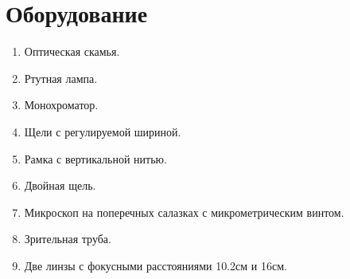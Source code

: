 \section*{Оборудование}

\begin{enumerate}
	\item Оптическая скамья.
	
	\item Ртутная лампа.
	
	\item Монохроматор.
	
	\item Щели с регулируемой шириной.
	
	\item Рамка с вертикальной нитью.
	
	\item Двойная щель.
	
	\item Микроскоп на поперечных салазках с микрометрическим винтом.
	
	\item Зрительная труба.
	
	\item Две линзы с фокусными расстояниями 10.2см и 16см.
\end{enumerate}